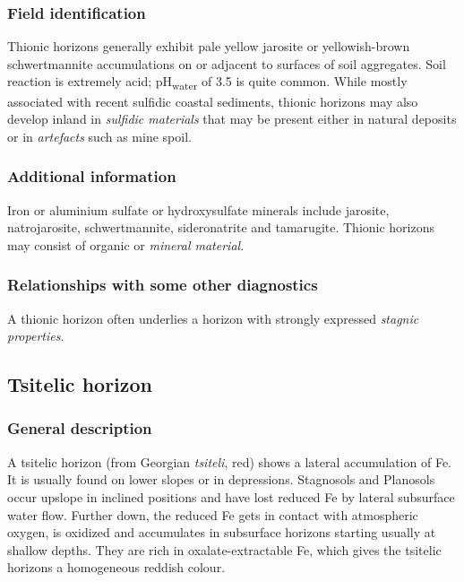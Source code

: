\documentclass[
  letterpaper,
  DIV=11,
  numbers=noendperiod]{scrreprt}
\begin{document}
\hypertarget{field-identification-28}{%
\subsubsection{Field identification}\label{field-identification-28}}

Thionic horizons generally exhibit pale yellow jarosite or
yellowish-brown schwertmannite accumulations on or adjacent to surfaces
of soil aggregates. Soil reaction is extremely acid;
pH\textsubscript{water} of 3.5 is quite common. While mostly associated
with recent sulfidic coastal sediments, thionic horizons may also
develop inland in \emph{sulfidic materials} that may be present either
in natural deposits or in \emph{artefacts} such as mine spoil.

\hypertarget{additional-information-20}{%
\subsubsection{Additional information}\label{additional-information-20}}

Iron or aluminium sulfate or hydroxysulfate minerals include jarosite,
natrojarosite, schwertmannite, sideronatrite and tamarugite. Thionic
horizons may consist of organic or \emph{mineral material}.

\hypertarget{relationships-with-some-other-diagnostics-35}{%
\subsubsection{Relationships with some other
diagnostics}\label{relationships-with-some-other-diagnostics-35}}

A thionic horizon often underlies a horizon with strongly expressed
\emph{stagnic properties}.

\hypertarget{tsitelic-horizon}{%
\subsection{Tsitelic horizon}\label{tsitelic-horizon}}

\hypertarget{general-description-37}{%
\subsubsection{General description}\label{general-description-37}}

A tsitelic horizon (from Georgian \emph{tsiteli}, red) shows a lateral
accumulation of Fe. It is usually found on lower slopes or in
depressions. Stagnosols and Planosols occur upslope in inclined
positions and have lost reduced Fe by lateral subsurface water flow.
Further down, the reduced Fe gets in contact with atmospheric oxygen, is
oxidized and accumulates in subsurface horizons starting usually at
shallow depths. They are rich in oxalate-extractable Fe, which gives the
tsitelic horizons a homogeneous reddish colour.
\end{document}
